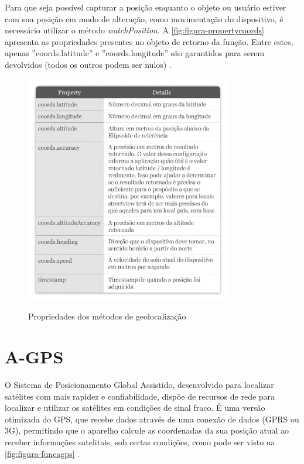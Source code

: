 Para que seja possível capturar a posição enquanto o objeto ou usuário estiver com sua posição em modo de alteração, como movimentação do dispositivo, é necessário utilizar o método \textit{watchPosition}. A \autoref{fig:figura-propertycoords} apresenta as propriedades presentes no objeto de retorno da função. Entre estes, apenas ''coords.latitude'' e ''coords.longitude'' são garantidos para serem devolvidos (todos os outros podem ser nulos) \cite{geolocalizacao:2011}.

\begin{figure}[H]
    \centering
    \caption{Propriedades dos métodos de geolocalização}
    \includegraphics[width=0.8\textwidth]{./dados/figuras/fig1}
    \label{fig:figura-propertycoords}
\end{figure}

\section{A-GPS}
O Sistema de Posicionamento Global Assistido, desenvolvido para localizar satélites com mais rapidez e confiabilidade, dispõe de recursos de rede para localizar e utilizar os satélites em condições de sinal fraco. É uma versão otimizada do  GPS, que recebe dados através de uma conexão de dados (GPRS ou 3G), permitindo que o aparelho calcule as coordenadas da sua posição atual ao receber informações satelitais, sob certas condições, como pode ser visto na \autoref{fig:figura-funcagps} \cite{oficinanetagps:2018}. 

